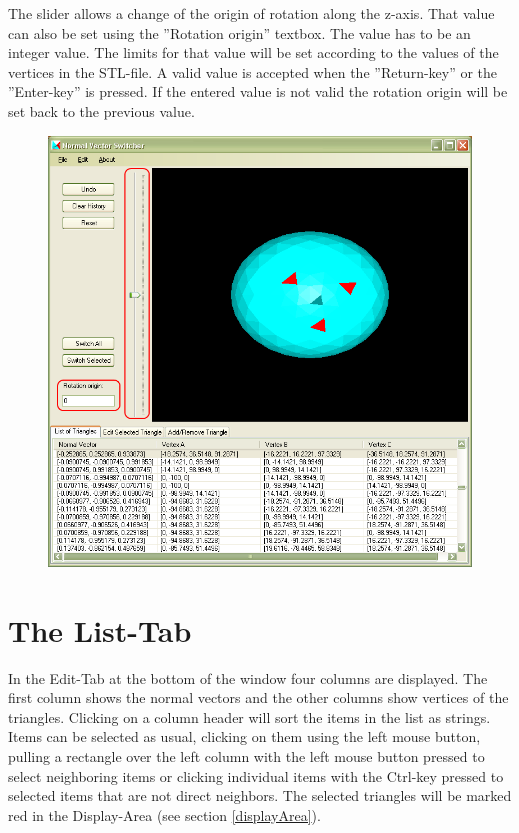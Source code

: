 \newpage\noindent
The slider allows a change of the origin of rotation along the z-axis. That value can also be set using the ''Rotation origin'' textbox. The value has to be an integer value. The limits for that value will be set according to the values of the vertices in the STL-file. A valid value is accepted when the ''Return-key'' or the ''Enter-key'' is pressed. If the entered value is not valid the rotation origin will be set back to the previous value.

\begin{figure}[hb]
	\centering
	\includegraphics[width=0.9\linewidth]{window3}
\end{figure}

\newpage
\section{The List-Tab}

In the Edit-Tab at the bottom of the window four columns are displayed. The first column shows the normal vectors and the other columns show vertices of the triangles.
Clicking on a column header will sort the items in the list as strings.
Items can be selected as usual, clicking on them using the left mouse button, pulling a rectangle over the left column with the left mouse button pressed to select neighboring items or clicking individual items with the Ctrl-key pressed to selected items that are not direct neighbors.
The selected triangles will be marked red in the Display-Area (see section \ref{displayArea}).

